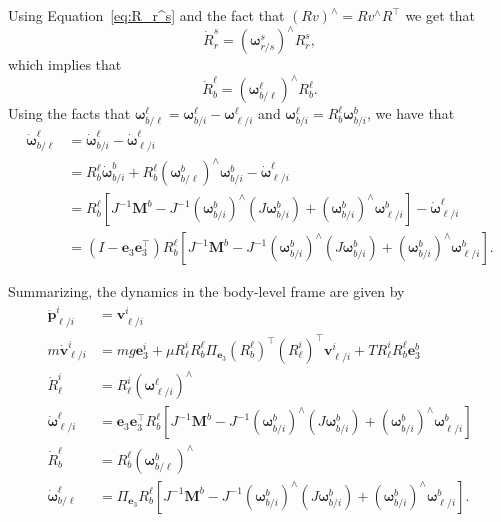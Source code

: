 Using Equation~\eqref{eq:R_r^s} and the fact that $(Rv)^\wedge = Rv^\wedge R^\top$ we get that
\[
\dot{R}_r^s = (\boldsymbol{\omega}_{r/s}^s)^\wedge R_r^s,
\]
which implies that
\[
\dot{R}_b^\ell = (\boldsymbol{\omega}_{b/\ell}^\ell)^\wedge R_b^\ell.
\]
Using the facts that $\boldsymbol{\omega}_{b/\ell}^\ell = \boldsymbol{\omega}_{b/i}^\ell - \boldsymbol{\omega}_{\ell/i}^\ell$ and $\boldsymbol{\omega}_{b/i}^\ell = R_b^\ell \boldsymbol{\omega}_{b/i}^b$, we have that
\begin{align*}
\dot{\boldsymbol{\omega}}_{b/\ell}^\ell &= 	\dot{\boldsymbol{\omega}}_{b/i}^\ell - \dot{\boldsymbol{\omega}}_{\ell/i}^\ell \\
&= R_b^\ell \dot{\boldsymbol{\omega}}_{b/i}^b + R_b^\ell(\boldsymbol{\omega}_{b/\ell}^b)^\wedge \boldsymbol{\omega}_{b/i}^b - \dot{\boldsymbol{\omega}}_{\ell/i}^\ell \\
&= R_b^\ell\left[  J^{-1}\mathbf{M}^b - J^{-1}(\boldsymbol{\omega}_{b/i}^b)^\wedge (J\boldsymbol{\omega}_{b/i}^b) + (\boldsymbol{\omega}_{b/i}^b)^\wedge \boldsymbol{\omega}_{\ell/i}^b \right]- \dot{\boldsymbol{\omega}}_{\ell/i}^\ell \\
&= (I-\mathbf{e}_3\mathbf{e}_3^\top) R_b^\ell\left[  J^{-1}\mathbf{M}^b - J^{-1}(\boldsymbol{\omega}_{b/i}^b)^\wedge (J\boldsymbol{\omega}_{b/i}^b) + (\boldsymbol{\omega}_{b/i}^b)^\wedge \boldsymbol{\omega}_{\ell/i}^b \right].
\end{align*}

Summarizing, the dynamics in the body-level frame are given by
\begin{align}
	\dot{\mathbf{p}}_{\ell/i}^i &= \mathbf{v}_{\ell/i}^i \label{eq:pdot_l/i^i}\\
	m\dot{\mathbf{v}}_{\ell/i}^i &= mg\mathbf{e}_3^i + \mu R_\ell^i R_b^\ell \Pi_{\mathbf{e}_3}(R_b^\ell)^\top (R_\ell^i)^\top \mathbf{v}_{\ell/i}^i + TR_\ell^i R_b^\ell \mathbf{e}_3^b \label{eq:vdot_l/i^i}\\
	\dot{R}_\ell^i &= R_\ell^i(\boldsymbol{\omega}_{\ell/i}^\ell)^\wedge \label{eq:Rdot_l^i}\\
	\dot{\boldsymbol{\omega}}_{\ell/i}^\ell &=\mathbf{e}_3\mathbf{e}_3^\top R_b^\ell \left[  J^{-1}\mathbf{M}^b - J^{-1}(\boldsymbol{\omega}_{b/i}^b)^\wedge (J\boldsymbol{\omega}_{b/i}^b) + (\boldsymbol{\omega}_{b/i}^b)^\wedge \boldsymbol{\omega}_{\ell/i}^b \right] \label{eq:omegadot_l/i^l} \\
	\dot{R}_b^\ell &= R_b^\ell (\boldsymbol{\omega}_{b/\ell}^b)^\wedge  \label{eq:Rdot_b^l} \\
	\dot{\boldsymbol{\omega}}_{b/\ell}^\ell &= 	\Pi_{\mathbf{e}_3} R_b^\ell\left[  J^{-1}\mathbf{M}^b - J^{-1}(\boldsymbol{\omega}_{b/i}^b)^\wedge (J\boldsymbol{\omega}_{b/i}^b) + (\boldsymbol{\omega}_{b/i}^b)^\wedge \boldsymbol{\omega}_{\ell/i}^b \right]. \label{eq:omegadot_b/l^l}
\end{align}


